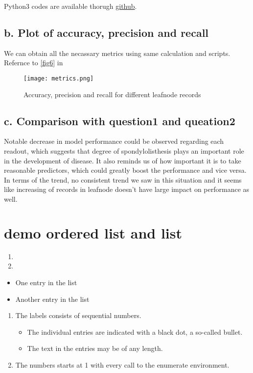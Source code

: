 \documentclass{article}
\begin{document}
Python3 codes are available thorugh \href{https://github.com/frankligy/exercise_codes/blob/master/decision_tree_copy3.py}{github}.



\subsection*{b. Plot of accuracy, precision and recall}
We can obtain all the necassary metrics using same calculation and scripts. Refernce to \autoref{fig6} in \pageref{fig6}

\begin{figure}[H]
    \centering
    \texttt{[image: metrics.png]}
    \caption{Accuracy, precision and recall for different leafnode records}
    \label{fig6}
\end{figure}
\subsection*{c. Comparison with question1 and queation2}
Notable decrease in model performance could be observed regarding each readout, which suggests that degree of spondylolisthesis plays an important role in the development of disease. It also reminds us of how important it is to take reasonable predictors, which could greatly boost the performance and vice versa. In terms of the trend, no consistent trend we saw in this situation and it seems like increasing of records in leafnode doesn't have large impact on performance as well.

\section{demo ordered list and list}
\begin{enumerate}
	\item 
	\item
\end{enumerate}

\begin{itemize}
  \item One entry in the list
  \item Another entry in the list
\end{itemize}

\begin{enumerate}
   \item The labels consists of sequential numbers.
   \begin{itemize}
     \item The individual entries are indicated with a black dot, a so-called bullet.
     \item The text in the entries may be of any length.
   \end{itemize}
   \item The numbers starts at 1 with every call to the enumerate environment.
\end{enumerate}
\end{document}
